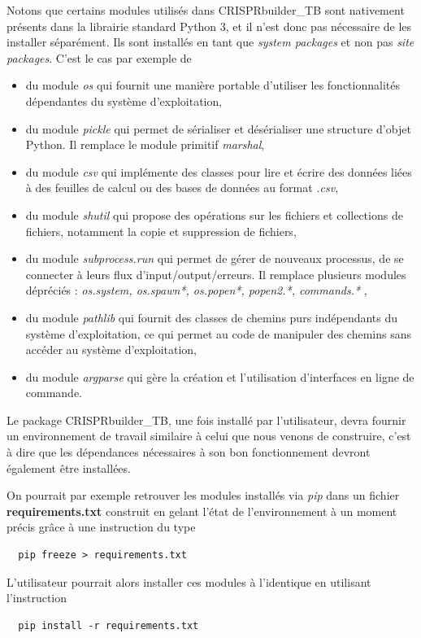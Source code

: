 \documentclass[twoside,a4paper,11pt,frenchb,openany]{report}
\begin{document}
Notons que certains modules utilisés dans CRISPRbuilder\_TB sont nativement présents dans la librairie standard Python 3, et il n'est donc pas nécessaire de les installer séparément. Ils sont installés en tant que \textit{system packages} et non pas \textit{site packages}. C'est le cas par exemple de
\begin{itemize}
\item du module \textit{os} qui fournit une manière portable d'utiliser les fonctionnalités dépendantes du système d'exploitation,
\item du module \textit{pickle} qui permet de sérialiser et désérialiser une structure d'objet Python. Il remplace le module primitif \textit{marshal},
\item du module \textit{csv} qui implémente des classes pour lire et écrire des données liées à des feuilles de calcul ou des bases de données au format \textit{.csv},
\item du module \textit{shutil} qui propose des opérations sur les fichiers et collections de fichiers, notamment la copie et suppression de fichiers,
\item du module \textit{subprocess.run} qui permet de gérer de nouveaux processus, de se connecter à leurs flux d'input/output/erreurs. Il remplace plusieurs modules dépréciés : \textit{os.system, os.spawn*, os.popen*, popen2.*, commands.* },
\item du module \textit{pathlib} qui fournit des classes de chemins purs indépendants du système d'exploitation, ce qui permet au code de manipuler des chemins sans accéder au système d'exploitation,
\item du module \textit{argparse} qui gère la création et l'utilisation d'interfaces en ligne de commande.
\end{itemize}

Le package CRISPRbuilder\_TB, une fois installé par l'utilisateur, devra fournir un environnement de travail similaire à celui que nous venons de construire, c'est à dire que les dépendances nécessaires à son bon fonctionnement devront également être installées. 

On pourrait par exemple retrouver les modules installés via \textit{pip} dans un fichier \textbf{requirements.txt} construit en gelant l'état de l'environnement à un moment précis grâce à une instruction du type 
\begin{verbatim}  pip freeze > requirements.txt\end{verbatim}

L'utilisateur pourrait alors installer ces modules à l'identique en utilisant l'instruction
\begin{verbatim}  pip install -r requirements.txt\end{verbatim}
\end{document}
